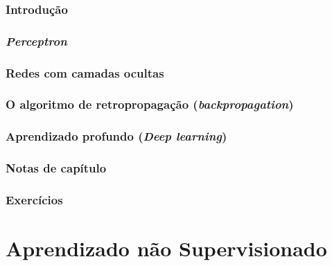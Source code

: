 \documentclass[
]{latex/krantz}
\theoremstyle{definition}
\theoremstyle{definition}
\theoremstyle{definition}
\theoremstyle{definition}
\theoremstyle{remark}
\begin{document}
\hypertarget{introduuxe7uxe3o-10}{%
\section{Introdução}\label{introduuxe7uxe3o-10}}

\hypertarget{perceptron}{%
\section{\texorpdfstring{\emph{Perceptron}}{Perceptron}}\label{perceptron}}

\hypertarget{redes-com-camadas-ocultas}{%
\section{Redes com camadas ocultas}\label{redes-com-camadas-ocultas}}

\hypertarget{o-algoritmo-de-retropropagauxe7uxe3o-backpropagation}{%
\section{\texorpdfstring{O algoritmo de retropropagação (\emph{backpropagation})}{O algoritmo de retropropagação (backpropagation)}}\label{o-algoritmo-de-retropropagauxe7uxe3o-backpropagation}}

\hypertarget{aprendizado-profundo-deep-learning}{%
\section{\texorpdfstring{Aprendizado profundo (\emph{Deep learning})}{Aprendizado profundo (Deep learning)}}\label{aprendizado-profundo-deep-learning}}

\hypertarget{notas-de-capuxedtulo-10}{%
\section{Notas de capítulo}\label{notas-de-capuxedtulo-10}}

\hypertarget{exercuxedcios-10}{%
\section{Exercícios}\label{exercuxedcios-10}}

\hypertarget{part-aprendizado-nuxe3o-supervisionado}{%
\part{Aprendizado não Supervisionado}\label{part-aprendizado-nuxe3o-supervisionado}}
\end{document}
